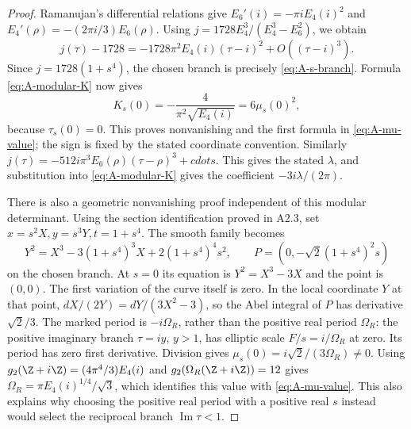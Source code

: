 \begin{proof}
Ramanujan's differential relations give
$E_6'(i)=-\pi i E_4(i)^2$ and
$E_4'(\rho)=-(2\pi i/3)E_6(\rho)$.
Using $j=1728E_4^3/(E_4^3-E_6^2)$, we obtain
\[
j(\tau)-1728=-1728\pi^2E_4(i)(\tau-i)^2+O((\tau-i)^3).
\]
Since $j=1728(1+s^4)$, the chosen branch is precisely
\eqref{eq:A-s-branch}.  Formula \eqref{eq:A-modular-K} now gives
\[
K_s(0)=-\frac4{\pi^2\sqrt{E_4(i)}}=6\mu_s(0)^2,
\]
because $\tau_s(0)=0$.  This proves nonvanishing and the first
formula in \eqref{eq:A-mu-value}; the sign is fixed by the stated
coordinate convention.  Similarly
$j(\tau)=-512i\pi^3E_6(\rho)(\tau-\rho)^3+cdots$.
This gives the stated $\lambda$, and substitution into
\eqref{eq:A-modular-K} gives the coefficient $-3i\lambda/(2\pi)$.

There is also a geometric nonvanishing proof independent of this
modular determinant.  Using the section identification proved in
A2.3, set $x=s^2X,y=s^3Y,t=1+s^4$.  The smooth family becomes
\[
Y^2=X^3-3(1+s^4)^3X+2(1+s^4)^4s^2,
\qquad P=(0,-\sqrt2(1+s^4)^2s)
\]
on the chosen branch.  At $s=0$ its equation is
$Y^2=X^3-3X$ and the point is $(0,0)$.  The first variation of the
curve itself is zero.  In the local coordinate $Y$ at that point,
$dX/(2Y)=dY/(3X^2-3)$, so the Abel integral of $P$ has derivative
$\sqrt2/3$.  The marked period is $-i\Omega_R$, rather than the
positive real period $\Omega_R$: the positive imaginary branch
$\tau=iy$, $y>1$, has elliptic scale $F/s=i/\Omega_R$ at zero.
Its period has zero first derivative.  Division gives
$\mu_s(0)=i\sqrt2/(3\Omega_R)\ne0$.
Using $g_2(\Z+i\Z)=(4\pi^4/3)E_4(i)$ and
$g_2(\Omega_R(\Z+i\Z))=12$ gives
$\Omega_R=\pi E_4(i)^{1/4}/\sqrt3$, which identifies this value
with \eqref{eq:A-mu-value}.  This also explains why choosing the
positive real period with a positive real $s$ instead would select
the reciprocal branch $\operatorname{Im}\tau<1$.


\end{proof}
